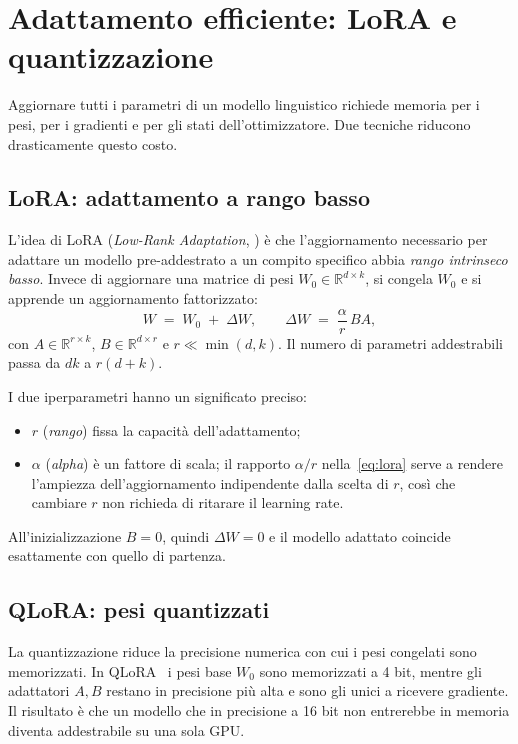 \section{Adattamento efficiente: LoRA e quantizzazione}

Aggiornare tutti i parametri di un modello linguistico richiede memoria per i
pesi, per i gradienti e per gli stati dell'ottimizzatore. Due tecniche riducono
drasticamente questo costo.

\subsection{LoRA: adattamento a rango basso}

L'idea di LoRA (\emph{Low-Rank Adaptation}, \cite{hu2021lora}) è che
l'aggiornamento necessario per adattare un modello pre-addestrato a un compito
specifico abbia \emph{rango intrinseco basso}. Invece di aggiornare una matrice
di pesi $W_0 \in \mathbb{R}^{d \times k}$, si congela $W_0$ e si apprende un
aggiornamento fattorizzato:
\begin{equation}
  \label{eq:lora}
  W \;=\; W_0 \;+\; \Delta W,
  \qquad
  \Delta W \;=\; \frac{\alpha}{r}\, B A,
\end{equation}
con $A \in \mathbb{R}^{r \times k}$, $B \in \mathbb{R}^{d \times r}$ e
$r \ll \min(d,k)$. Il numero di parametri addestrabili passa da $dk$ a
$r(d+k)$.

I due iperparametri hanno un significato preciso:
\begin{itemize}
  \item $r$ (\emph{rango}) fissa la capacità dell'adattamento;
  \item $\alpha$ (\emph{alpha}) è un fattore di scala; il rapporto $\alpha/r$
        nella~\eqref{eq:lora} serve a rendere l'ampiezza dell'aggiornamento
        indipendente dalla scelta di $r$, così che cambiare $r$ non richieda di
        ritarare il learning rate.
\end{itemize}
All'inizializzazione $B = 0$, quindi $\Delta W = 0$ e il modello adattato
coincide esattamente con quello di partenza.

\subsection{QLoRA: pesi quantizzati}

La quantizzazione riduce la precisione numerica con cui i pesi congelati sono
memorizzati. In QLoRA~\cite{dettmers2023qlora} i pesi base $W_0$ sono
memorizzati a 4 bit, mentre gli adattatori $A, B$ restano in precisione più
alta e sono gli unici a ricevere gradiente. Il risultato è che un modello che in
precisione a 16 bit non entrerebbe in memoria diventa addestrabile su una sola
GPU.

